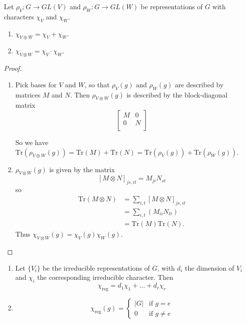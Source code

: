 \begin{prop}
Let $\rho_V \colon G \to GL(V)$ and $\rho_W \colon G \to GL(W)$ be representations of $G$ with characters $\chi_V$ and $\chi_W$.
\begin{enumerate}
\item $\chi _{V \oplus W} = \chi_V + \chi_W$.
\item $\chi_{V \otimes W} = \chi_V \cdot \chi_W$.
\end{enumerate}
\end{prop}
\begin{proof}
\begin{enumerate}
\item Pick bases for $V$ and $W$, so that $\rho_V (g)$ and $\rho_W (g)$ are described by matrices $M$ and $N$.  Then $\rho_{V \oplus W} (g)$ is described by the block-diagonal matrix
\[ \begin{bmatrix}
M & 0 \\
0 & N \\
\end{bmatrix} \]

So we have $\text{Tr} (\rho_{V \oplus W} (g)) = \text{Tr} (M) + \text{Tr}(N) = \text{Tr}(\rho_V (g)) + \text{Tr} (\rho_W (g))$.
\item $\rho_ {V \otimes W}(g)$ is given by the matrix
\[ [M \otimes N ]_{js, it} = M_{ji} N_{st} \]
so
\begin{align*}
\text{Tr} (M \otimes N) &= \sum_{i,t} [M \otimes N]_{js,it} \\
	&= \sum_{i,t} (M_{ii} N_{tt}) \\
	&= \text{Tr} (M) \text{Tr} (N).
\end{align*}
Thus $\chi_{V \otimes W} (g)= \chi_V (g) \chi_W(g)$.
\end{enumerate}
\end{proof}

\begin{prop}
\begin{enumerate}
\item Let $\{ V_i \}$ be the irreducible representations of $G$, with $d_i$  the dimension of  $V_i$ and $\chi_i$ the corresponding irreducible character.  Then
\[ \chi_{\text{reg}} = d_1 \chi_1 + \ldots + d_r \chi_r \]

\item \[  
\chi_{\text{reg}} (g) = \begin{cases} 
|G| &\text{if } g = e \\ 
0 & \text{if } g \neq e 
\end{cases}  \]
\end{enumerate}
\end{prop}

